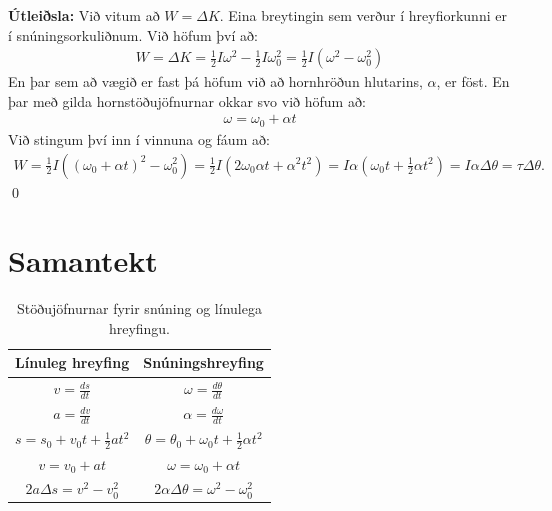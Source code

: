 \textbf{Útleiðsla:} Við vitum að $W = \Delta K$. Eina breytingin sem verður í hreyfiorkunni er í snúningsorkuliðnum. Við höfum því að:
\begin{align*}
    W = \Delta K = \frac{1}{2}I \omega^2 - \frac{1}{2}I\omega_0^2 = \frac{1}{2}I\left( \omega^2 - \omega_0^2 \right)
\end{align*}
En þar sem að vægið er fast þá höfum við að hornhröðun hlutarins, $\alpha$, er föst. En þar með gilda hornstöðujöfnurnar okkar svo við höfum að:
\begin{align*}
    \omega = \omega_0 + \alpha t
\end{align*}
Við stingum því inn í vinnuna og fáum að:
\begin{align*}
    W = \frac{1}{2}I\left( (\omega_0 + \alpha t)^2 - \omega_0^2 \right) = \frac{1}{2}I \left( 2\omega_0 \alpha t + \alpha^2 t^2 \right) = I\alpha \left( \omega_0 t + \frac{1}{2}\alpha t^2 \right) = I\alpha \Delta \theta = \tau \Delta \theta.
\end{align*}
\qed


\section*{Samantekt}

\begin{table}[H]
\begin{center}
\begin{tabular}{|c|c|}
\hline
\textbf{Línuleg hreyfing} & \textbf{Snúningshreyfing} \\
\hline
$v = \frac{ds}{dt} $ & $\omega = \frac{d\theta}{dt}$ \\
$a = \frac{dv}{dt} $ & $\alpha = \frac{d\omega}{dt}$ \\
$s = s_0 + v_0t + \frac{1}{2}at^2 $ & $\theta = \theta_0 + \omega_0 t + \frac{1}{2}\alpha t^2$ \\
$v = v_0 + a t$ & $\omega = \omega_0 + \alpha t$ \\
$2a \Delta s = v^2 - v_0^2$ & $2 \alpha \Delta \theta = \omega^2 - \omega_0^2$  \\
\hline
\end{tabular}
\caption{Stöðujöfnurnar fyrir snúning og línulega hreyfingu.}
\label{tafla:raddi}
\end{center}
\end{table}


